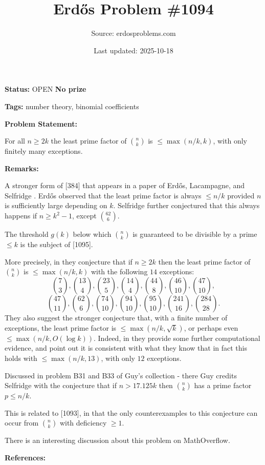\documentclass{article}
\title{Erd\H{o}s Problem \#1094}
\date{Last updated: 2025-10-18}
\author{Source: erdosproblems.com}
\begin{document}
\maketitle

\noindent\textbf{Status:} OPEN \quad \textbf{No prize}

\noindent\textbf{Tags:} number theory, binomial coefficients

\medskip
\noindent\textbf{Problem Statement:}

For all $n\geq 2k$ the least prime factor of $\binom{n}{k}$ is $\leq \max(n/k,k)$, with only finitely many exceptions.

\bigskip
\noindent\textbf{Remarks:}

A stronger form of [384] that appears in a paper of Erd\H{o}s, Lacampagne, and Selfridge \cite{ELS88}. Erd\H{o}s observed that the least prime factor is always $\leq n/k$ provided $n$ is sufficiently large depending on $k$. Selfridge \cite{Se77} further conjectured that this always happens if $n\geq k^2-1$, except $\binom{62}{6}$.

The threshold $g(k)$ below which $\binom{n}{k}$ is guaranteed to be divisible by a prime $\leq k$ is the subject of [1095].

More precisely, in \cite{ELS88} they conjecture that if $n\geq 2k$ then the least prime factor of $\binom{n}{k}$ is $\leq \max(n/k,k)$ with the following $14$ exceptions:\[\binom{7}{3},\binom{13}{4},\binom{23}{5},\binom{14}{4},\binom{44}{8},\binom{46}{10},\binom{47}{10},\]\[\binom{47}{11},\binom{62}{6},\binom{74}{10},\binom{94}{10},\binom{95}{10},\binom{241}{16},\binom{284}{28}.\]They also suggest the stronger conjecture that, with a finite number of exceptions, the least prime factor is $\leq \max(n/k,\sqrt{k})$, or perhaps even $\leq \max(n/k,O(\log k))$. Indeed, in \cite{ELS93} they provide some further computational evidence, and point out it is consistent with what they know that in fact this holds with $\leq \max(n/k,13)$, with only $12$ exceptions.

Discussed in problem B31 and B33 of Guy's collection \cite{Gu04} - there Guy credits Selfridge with the conjecture that if $n> 17.125k$ then $\binom{n}{k}$ has a prime factor $p\leq n/k$. 

This is related to [1093], in that the only counterexamples to this conjecture can occur from $\binom{n}{k}$ with deficiency $\geq 1$.

There is an interesting discussion about this problem on MathOverflow.

\bigskip
\noindent\textbf{References:}
\end{document}
